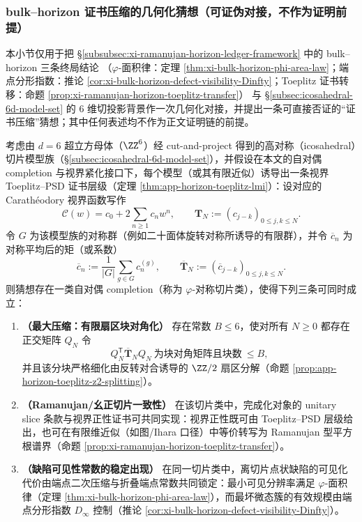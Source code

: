 \subsubsection{bulk--horizon 证书压缩的几何化猜想（可证伪对接，不作为证明前提）}\label{subsubsec:discussion-bulk-horizon-certificate-compression}
本小节仅用于把 \S\ref{subsubsec:xi-ramanujan-horizon-ledger-framework} 中的 bulk--horizon 三条终局结论
（\(\varphi\)-面积律：定理 \ref{thm:xi-bulk-horizon-phi-area-law}；端点分形指数：推论 \ref{cor:xi-bulk-horizon-defect-visibility-Dinfty}；Toeplitz 证书转移：命题 \ref{prop:xi-ramanujan-horizon-toeplitz-transfer}）
与 \S\ref{subsec:icosahedral-6d-model-set} 的 \(6\) 维切投影背景作一次几何化对接，并提出一条可直接否证的“证书压缩”猜想；其中任何表述均不作为正文证明链的前提。

\begin{conjecture}\label{conj:discussion-phi-symmetric-slice-extremal}
考虑由 \(d=6\) 超立方母体（\(\ZZ^6\)）经 cut-and-project 得到的高对称（icosahedral）切片模型族（\S\ref{subsec:icosahedral-6d-model-set}），并假设在本文的自对偶 completion 与视界紧化接口下，每个模型（或其有限近似）诱导出一条视界 Toeplitz--PSD 证书层级（定理 \ref{thm:app-horizon-toeplitz-lmi}）：设对应的 Carath\'eodory 视界函数写作
\[
\mathscr{C}(w)=c_0+2\sum_{n\ge 1}c_n w^n,\qquad
\mathbf{T}_N:=(c_{j-k})_{0\le j,k\le N}.
\]
令 \(G\) 为该模型族的对称群（例如二十面体旋转对称所诱导的有限群），并令 \(\overline c_n\) 为对称平均后的矩（或系数）
\[
\overline c_n:=\frac{1}{|G|}\sum_{g\in G} c_n^{(g)},
\qquad
\overline{\mathbf{T}}_N:=(\overline c_{j-k})_{0\le j,k\le N}.
\]
则猜想存在一类自对偶 completion（称为 \(\varphi\)-对称切片类），使得下列三条可同时成立：
\begin{enumerate}
  \item \textbf{（最大压缩：有限扇区块对角化）}
  存在常数 \(B\le 6\)，使对所有 \(N\ge 0\) 都存在正交矩阵 \(Q_N\) 令
  \[
  Q_N^{\mathsf T}\overline{\mathbf{T}}_N Q_N
  \ \text{为块对角矩阵且块数}\ \le B,
  \]
  并且该分块严格细化由反转对合诱导的 \(\ZZ/2\) 扇区分解（命题 \ref{prop:app-horizon-toeplitz-z2-splitting}）。
  \item \textbf{（Ramanujan/幺正切片一致性）}
  在该切片类中，完成化对象的 unitary slice 条款与视界正性证书可共同实现：视界正性既可由 Toeplitz--PSD 层级给出，也可在有限维近似（如图/Ihara 口径）中等价转写为 Ramanujan 型平方根谱界（命题 \ref{prop:xi-ramanujan-horizon-toeplitz-transfer}）。
  \item \textbf{（缺陷可见性常数的稳定出现）}
  在同一切片类中，离切片点状缺陷的可见化代价由端点二次压缩与折叠端点常数共同锁定：最小可见分辨率满足 \(\varphi\)-面积律（定理 \ref{thm:xi-bulk-horizon-phi-area-law}），而最坏微态簇的有效规模由端点分形指数 \(D_\infty\) 控制（推论 \ref{cor:xi-bulk-horizon-defect-visibility-Dinfty}）。
\end{enumerate}
\end{conjecture}

